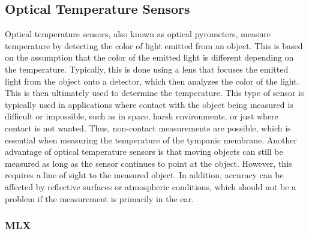 \subsection{Optical Temperature Sensors}
\label{Background:TemperatureSensors:OpticalTS}
Optical temperature sensors, also known as optical pyrometers, measure temperature by detecting the color of light emitted from an object. 
This is based on the assumption that the color of the emitted light is different depending on the temperature.
Typically, this is done using a lens that focuses the emitted light from the object onto a detector, which then analyzes the color of the light. 
This is then ultimately used to determine the temperature.
This type of sensor is typically used in applications where contact with the object being measured is difficult or impossible, such as in space, harsh environments, or just where contact is not wanted.
Thus, non-contact measurements are possible, which is essential when measuring the temperature of the tympanic membrane.
Another advantage of optical temperature sensors is that moving objects can still be measured as long as the sensor continues to point at the object.
However, this requires a line of sight to the measured object.
In addition, accuracy can be affected by reflective surfaces or atmospheric conditions, which should not be a problem if the measurement is primarily in the ear.

\subsubsection{MLX}
\label{Background:TemperatureSensors:OpticalTS:MLX}


